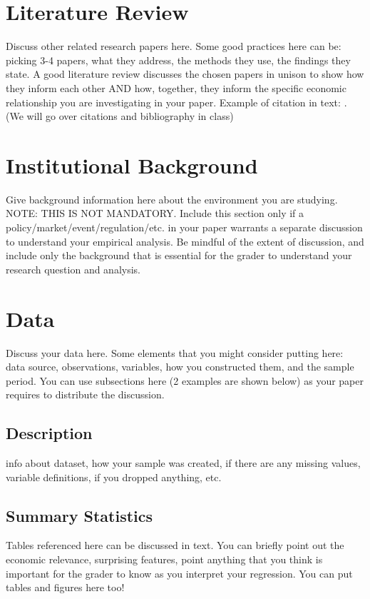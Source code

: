 \documentclass[11pt]{article}
\begin{document}
\section{Literature Review}
Discuss other related research papers here. Some good practices here can be: picking 3-4 papers, what they address, the methods they use, the findings they state. A good literature review discusses the chosen papers in unison to show how they inform each other AND how, together, they inform the specific economic relationship you are investigating in your paper. Example of citation in text: \cite{LABEL1}. (We will go over citations and bibliography in class) %

\section{Institutional Background}
Give background information here about the environment you are studying. NOTE: THIS IS NOT MANDATORY. Include this section only if a policy/market/event/regulation/etc. in your paper warrants a separate discussion to understand your empirical analysis. Be mindful of the extent of discussion, and include only the background that is essential for the grader to understand your research question and analysis.

\section{Data}
Discuss your data here. Some elements that you might consider putting here: data source, observations, variables, how you constructed them, and the sample period. You can use subsections here (2 examples are shown below) as your paper requires to distribute the discussion.

\subsection{Description}
info about dataset, how your sample was created, if there are any missing values, variable definitions, if you dropped anything, etc. 

\subsection{Summary Statistics}
Tables referenced here can be discussed in text. You can briefly point out the economic relevance, surprising features, point anything that you think is important for the grader to know as you interpret your regression. You can put tables and figures here too!
\end{document}
